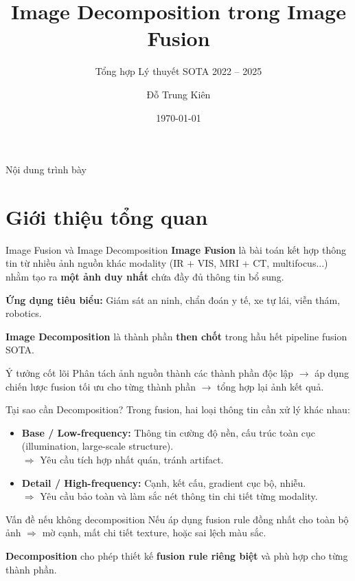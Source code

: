 \documentclass{beamer}
\title{Image Decomposition trong Image Fusion}
\subtitle{Tổng hợp Lý thuyết SOTA 2022 -- 2025}
\author{Đỗ Trung Kiên}
\institute{Đại học Bách khoa Hà Nội}
\date{\today}
\begin{document}
\frame{\titlepage}

\begin{frame}{Nội dung trình bày}
    \tableofcontents
\end{frame}

\section{Giới thiệu tổng quan}

\begin{frame}{Image Fusion và Image Decomposition}
    \textbf{Image Fusion} là bài toán kết hợp thông tin từ nhiều ảnh nguồn khác modality (IR + VIS, MRI + CT, multifocus...) nhằm tạo ra \textbf{một ảnh duy nhất} chứa đầy đủ thông tin bổ sung.

    \vspace{0.2cm}
    \textbf{Ứng dụng tiêu biểu:} Giám sát an ninh, chẩn đoán y tế, xe tự lái, viễn thám, robotics.

    \vspace{0.3cm}
    \textbf{Image Decomposition} là thành phần \textbf{then chốt} trong hầu hết pipeline fusion SOTA.

    \vspace{0.2cm}
    \begin{block}{Ý tưởng cốt lõi}
        Phân tách ảnh nguồn thành các thành phần độc lập $\to$ áp dụng chiến lược fusion tối ưu cho từng thành phần $\to$ tổng hợp lại ảnh kết quả.
    \end{block}
\end{frame}

\begin{frame}{Tại sao cần Decomposition?}
    Trong fusion, hai loại thông tin cần xử lý khác nhau:

    \vspace{0.2cm}
    \begin{itemize}
        \item \textbf{Base / Low-frequency:} Thông tin cường độ nền, cấu trúc toàn cục (illumination, large-scale structure). \\
        $\Rightarrow$ Yêu cầu tích hợp nhất quán, tránh artifact.
        \item \textbf{Detail / High-frequency:} Cạnh, kết cấu, gradient cục bộ, nhiễu. \\
        $\Rightarrow$ Yêu cầu bảo toàn và làm sắc nét thông tin chi tiết từng modality.
    \end{itemize}

    \vspace{0.3cm}
    \begin{alertblock}{Vấn đề nếu không decomposition}
        Nếu áp dụng fusion rule đồng nhất cho toàn bộ ảnh $\Rightarrow$ mờ cạnh, mất chi tiết texture, hoặc sai lệch màu sắc.
    \end{alertblock}

    \vspace{0.2cm}
    \textbf{Decomposition} cho phép thiết kế \textbf{fusion rule riêng biệt} và phù hợp cho từng thành phần.
\end{frame}
\end{document}

